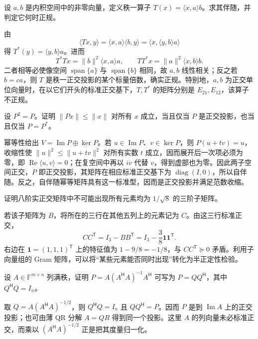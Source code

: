 \begin{example}
设 $a,b$ 是内积空间中的非零向量，定义秩一算子 $T(x)=\langle x,a\rangle b$。求其伴随，并判定它何时正规。
\end{example}
\begin{solve}
由
\[
\langle Tx,y\rangle=\langle x,a\rangle\langle b,y\rangle
=\langle x,\langle y,b\rangle a\rangle
\]
得 $T^*(y)=\langle y,b\rangle a$。进而
\[
T^*Tx=\|b\|^2\langle x,a\rangle a,\qquad
TT^*x=\|a\|^2\langle x,b\rangle b.
\]
二者相等必使像空间 $\operatorname{span}\{a\}$ 与 $\operatorname{span}\{b\}$ 相同，故 $a,b$ 线性相关；反之若 $b=ca$，则 $T$ 是秩一正交投影的某个标量倍数，确实正规。特别地，$a,b$ 为正交单位向量时，在以它们开头的标准正交基下，$T,T^*$ 的矩阵分别是 $E_{21},E_{12}$，该算子不正规。
\end{solve}

\begin{example}
设 $P^2=P$。证明 $\|Px\|\leq\|x\|$ 对所有 $x$ 成立，当且仅当 $P$ 是正交投影，也当且仅当 $P=P^*$。
\end{example}
\begin{solve}
幂等性给出 $V=\operatorname{Im}P\oplus\ker P$。若 $u\in\operatorname{Im}P$、$v\in\ker P$，则 $P(u+tv)=u$，收缩性使 $\|u\|^2\leq\|u+tv\|^2$ 对所有实数 $t$ 成立，因而展开后一次项必须为零，即 $\operatorname{Re}\langle u,v\rangle=0$；在复空间中再以 $iv$ 代替 $v$，得到虚部也为零。因此两子空间正交，$P$ 即正交投影，其矩阵在相应标准正交基下为 $\operatorname{diag}(I,0)$，所以自伴随。反之，自伴随幂等矩阵具有这一标准型，因而是正交投影并满足范数收缩。
\end{solve}

\begin{example}
证明八阶实正交矩阵中不可能出现所有元素均为 $1/\sqrt8$ 的三阶子矩阵。
\end{example}
\begin{solve}
若该子矩阵为 $B$，将所在的三行在其他五列上的元素记为 $C$。由这三行标准正交，
\[
CC^{\mathsf T}=I_3-BB^{\mathsf T}
=I_3-\frac38\boldsymbol1\boldsymbol1^{\mathsf T}.
\]
右边在 $\boldsymbol1=(1,1,1)^{\mathsf T}$ 上的特征值为 $1-9/8=-1/8$，与 $CC^{\mathsf T}\succeq0$ 矛盾。利用子向量组的 Gram 矩阵，可以将“某些元素能否同时出现”转化为半正定性检验。
\end{solve}

\begin{example}
设 $A\in\mathbb F^{m\times n}$ 列满秩，证明 $P=A(A^{\mathsf H}A)^{-1}A^{\mathsf H}$ 可写为 $P=QQ^{\mathsf H}$，其中 $Q^{\mathsf H}Q=I_n$。
\end{example}
\begin{solve}
取 $Q=A(A^{\mathsf H}A)^{-1/2}$，则 $Q^{\mathsf H}Q=I_n$ 且 $QQ^{\mathsf H}=P$。因而 $P$ 是到 $\operatorname{Im}A$ 上的正交投影；也可由薄 QR 分解 $A=QR$ 得到同一个投影。这里 $A$ 的列向量未必标准正交，而乘以 $(A^{\mathsf H}A)^{-1/2}$ 正是把其度量归一化。
\end{solve}


